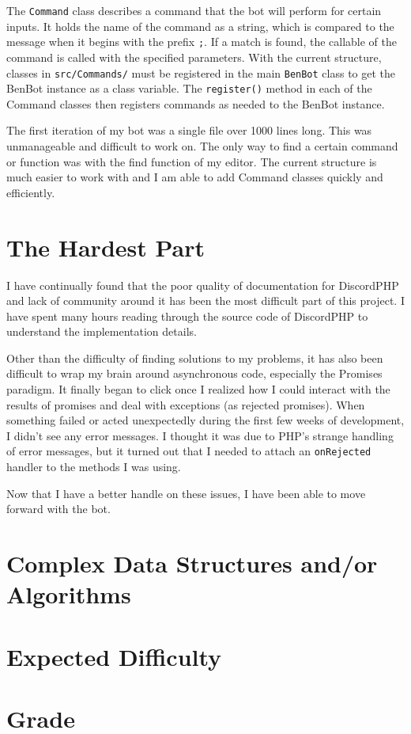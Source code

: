 \documentclass[12pt]{article} %
\begin{document}
The \verb|Command| class describes a command that the bot will perform for certain inputs. It holds the name of the command as a string, which is compared to the message when it begins with the prefix \verb|;|. If a match is found, the callable of the command is called with the specified parameters. With the current structure, classes in \verb|src/Commands/| must be registered in the main \verb|BenBot| class to get the BenBot instance as a class variable. The \verb|register()| method in each of the Command classes then registers commands as needed to the BenBot instance.

The first iteration of my bot was a single file over 1000 lines long. This was unmanageable and difficult to work on. The only way to find a certain command or function was with the find function of my editor. The current structure is much easier to work with and I am able to add Command classes quickly and efficiently.

\section*{The Hardest Part}

I have continually found that the poor quality of documentation for DiscordPHP and lack of community around it has been the most difficult part of this project. I have spent many hours reading through the source code of DiscordPHP to understand the implementation details.

Other than the difficulty of finding solutions to my problems, it has also been difficult to wrap my brain around asynchronous code, especially the Promises paradigm. It finally began to click once I realized how I could interact with the results of promises and deal with exceptions (as rejected promises). When something failed or acted unexpectedly during the first few weeks of development, I didn't see any error messages. I thought it was due to PHP's strange handling of error messages, but it turned out that I needed to attach an \verb|onRejected| handler to the methods I was using.

Now that I have a better handle on these issues, I have been able to move forward with the bot.

\section*{Complex Data Structures and/or Algorithms}



\section*{Expected Difficulty}



\section*{Grade}
\end{document}

